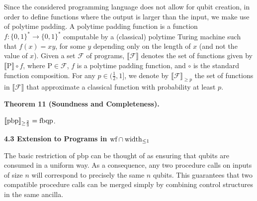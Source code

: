 \documentclass[10pt,a4paper]{amsart}
\begin{document}
 
 
Since the considered programming language does not allow for qubit creation, in order to define functions where the output is larger than the input, we make use of polytime padding. A polytime padding function is a function $f:\{0,1\}^{\ast}\to\{0,1\}^{\ast}$ computable by a (classical) polytime Turing machine such that $f(x)=xy$, for some $y$ depending only on the length of $x$ (and not the value of $x$). Given a set $\mathcal{F}$ of programs, $\llbracket\mathcal{F}\rrbracket$ denotes the set of functions given by $\llbracket\mathrm{P}\rrbracket\circ f$, where $\mathrm{P}\in\mathcal{F}$, $f$ is a polytime padding function, and $\circ$ is the standard function composition. For any $p\in(\frac{1}{2},1]$, we denote by $\llbracket\mathcal{F}\rrbracket_{\geq p}$ the set of functions in $\llbracket\mathcal{F}\rrbracket$ that approximate a classical function with probability at least $p$.\par
 
 
 
\par\medskip\noindent\textbf{Theorem 11 (Soundness and Completeness).}\par
 
 
$\llbracket\textnormal{{pbp}}{}\rrbracket_{\geq\frac{2}{3}}=\textnormal{{fbqp}}{}$.\par
 
 
 
 
 
\par\medskip\noindent\textbf{4.3 Extension to Programs in $\textnormal{{wf}}\cap\textnormal{{width}}_{\leq 1}$}\par
 
 
The basic restriction of pbp can be thought of as ensuring that qubits are consumed in a uniform way. As a consequence, any two procedure calls on inputs of size $n$ will correspond to precisely the same $n$ qubits. This guarantees that two compatible procedure calls can be merged simply by combining control structures in the same ancilla.\par
 
\end{document}
